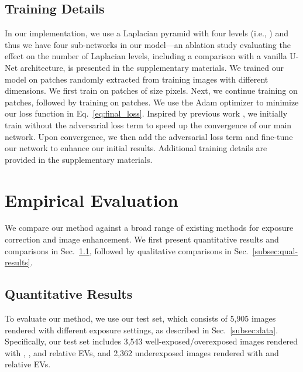 \documentclass[final]{cvpr}
\begin{document}
\subsection{Training Details}\label{subsec:training_details}

In our implementation, we use a Laplacian pyramid with four levels (i.e., ) and thus we have four sub-networks in our model---an ablation study evaluating the effect on the
number of Laplacian levels, including a comparison with a vanilla U-Net architecture, is presented in the supplementary materials. We trained our model on patches randomly extracted from training images with different dimensions. We first train on patches of size  pixels. Next, we continue training on  patches, followed by training on  patches. We use the Adam optimizer \cite{kingma2014adam} to minimize our loss function in Eq.\ \ref{eq:final_loss}.
Inspired by previous work \cite{ma2017pose}, we initially train
 without the adversarial loss term  to speed up the convergence of our main network. Upon convergence, we then add the adversarial loss term 
 and fine-tune our network to enhance our initial results. Additional training details are provided  in the supplementary materials.




\section{Empirical Evaluation} \label{sec:results}







We compare our method against a broad range of existing methods for exposure correction and image enhancement. We first present quantitative results and comparisons in Sec.\ \ref{subsec:quan-results}, followed by qualitative comparisons in Sec.\ \ref{subsec:qual-results}.








\subsection{Quantitative Results} \label{subsec:quan-results}

To evaluate our method, we use our test set, which consists of 5,905 images rendered with different exposure settings, as described in Sec.\ \ref{subsec:data}. Specifically, our test set includes 3,543 well-exposed/overexposed images rendered with , , and  relative EVs, and 2,362 underexposed images rendered with  and  relative EVs.
\end{document}
